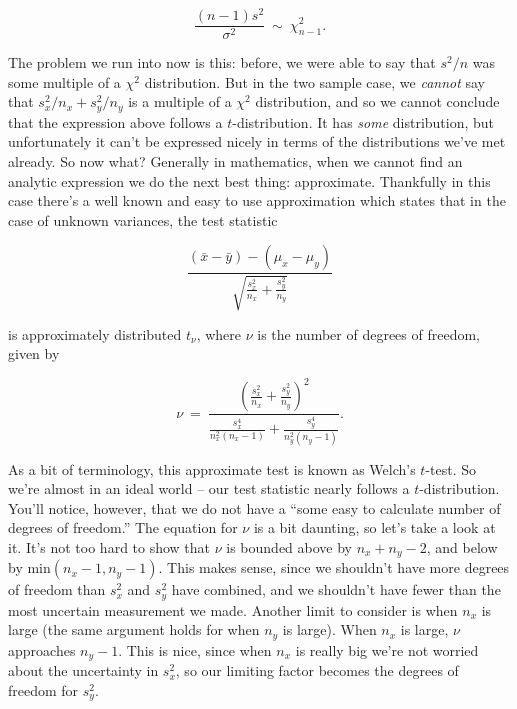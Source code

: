 \begin{equation*}

\frac{\left(n-1\right)s^2}{\sigma^2} \ \sim \  \chi^2_{n-1}.

\end{equation*}

The problem we run into now is this: before, we were able to say that $s^2/n$ was some multiple of a $\chi^2$ distribution.  But in the two sample case, we \emph{cannot} say that $s^2_x/n_x + s^2_y/n_y$ is a multiple of a $\chi^2$ distribution, and so we cannot conclude that the expression above follows a $t$-distribution.  It has \emph{some} distribution, but unfortunately it can't be expressed nicely in terms of the  distributions we've met already.  So now what?  Generally in mathematics, when we cannot find an analytic expression we do the next best thing: approximate.  Thankfully in this case there's a well known and easy to use approximation which states that in the case of unknown variances,   the test statistic



\begin{equation*}

\frac{\left(\bar{x}-\bar{y}\right)-\left(\mu_x - \mu_y\right)}{\sqrt{\frac{s^2_x}{n_x} + \frac{s^2_y}{n_y}}}

\end{equation*}

is approximately distributed $t_\nu$, where $\nu$ is the number of degrees of freedom, given by

\begin{equation*}

\nu\ =\ \frac{\left(\frac{s^2_x}{n_x} + \frac{s^2_y}{n_y}\right)^2}{\frac{s^4_x}{n^2_x\left(n_x - 1\right)} + \frac{s^4_y}{n^2_y\left(n_y - 1\right)}}.

\end{equation*}



As a bit of terminology, this approximate test is known as Welch's $t$-test.  So we're almost in an ideal world -- our test statistic nearly follows a $t$-distribution.  You'll notice, however, that we do not have a ``some easy to calculate number of degrees of freedom.''  The equation for $\nu$ is a bit daunting, so let's take a look at it.  It's not too hard to show that $\nu$ is bounded above by $n_x + n_y - 2$, and below by $\textrm{min}(n_x - 1, n_y - 1)$.  This makes sense, since we shouldn't have more degrees of freedom than $s^2_x$ and $s^2_y$ have combined, and we shouldn't have fewer than the most uncertain measurement we made.  Another limit to consider is when $n_x$ is large (the same argument holds for when $n_y$ is large).  When $n_x$ is large, $\nu$ approaches $n_y - 1$.  This is nice, since when $n_x$ is really big we're not worried about the uncertainty in $s^2_x$, so our limiting factor becomes the degrees of freedom for $s^2_y$.



